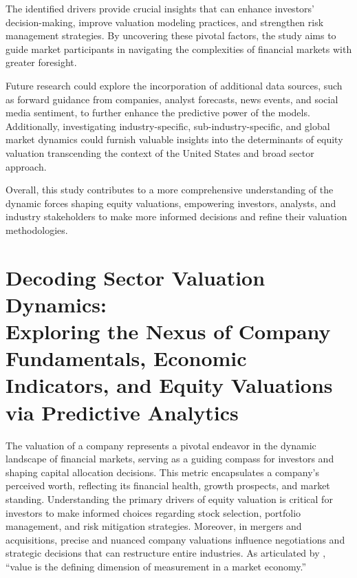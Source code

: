 \documentclass[12pt,a4paper,english]{article}
\begin{document}
The identified drivers provide crucial insights that can enhance investors' decision-making, improve valuation modeling practices, and strengthen risk management strategies. By uncovering these pivotal factors, the study aims to guide market participants in navigating the complexities of financial markets with greater foresight.

Future research could explore the incorporation of additional data sources, such as forward guidance from companies, analyst forecasts, news events, and social media sentiment, to further enhance the predictive power of the models. Additionally, investigating industry-specific, sub-industry-specific, and global market dynamics could furnish valuable insights into the determinants of equity valuation transcending the context of the United States and broad sector approach.

Overall, this study contributes to a more comprehensive understanding of the dynamic forces shaping equity valuations, empowering investors, analysts, and industry stakeholders to make more informed decisions and refine their valuation methodologies.

\clearpage
\tableofcontents

\cleardoublepage
\listoffigures

\cleardoublepage
\listoftables
\cleardoublepage

\pagestyle{main}

\section*{Decoding Sector Valuation Dynamics: \\Exploring the Nexus of Company Fundamentals, Economic Indicators, and Equity Valuations via Predictive Analytics}

The valuation of a company represents a pivotal endeavor in the dynamic landscape of financial markets, serving as a guiding compass for investors and shaping capital allocation decisions. This metric encapsulates a company's perceived worth, reflecting its financial health, growth prospects, and market standing. Understanding the primary drivers of equity valuation is critical for investors to make informed choices regarding stock selection, portfolio management, and risk mitigation strategies. Moreover, in mergers and acquisitions, precise and nuanced company valuations influence negotiations and strategic decisions that can restructure entire industries. As articulated by , \enquote{value is the defining dimension of measurement in a market economy.}
\end{document}
